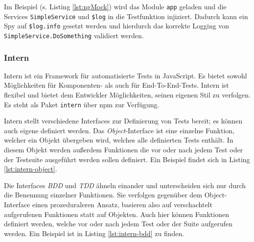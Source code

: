 \begin{figure}[H]
	
\end{figure}

Im Beispiel (s. Listing \ref{lst:ngMock}) wird das Module \texttt{app} geladen und die Services \texttt{SimpleService} und \texttt{\$log} in die Testfunktion injiziert. Dadurch kann ein Spy auf \texttt{\$log.info} gesetzt werden und hierdurch das korrekte Logging von \texttt{SimpleService.DoSomething} validiert werden.


\subsubsection{Intern}
\label{sec:Intern}
Intern ist ein Framework für automatisierte Tests in JavaScript. Es bietet sowohl Möglichkeiten für Komponenten- als auch für End-To-End-Tests. Intern ist flexibel und bietet dem Entwickler Möglichkeiten, seinen eigenen Stil zu verfolgen. Es steht als Paket \texttt{intern} über npm zur Verfügung.\cite{intern-userguide}

Intern stellt verschiedene Interfaces zur Definierung von Tests bereit; es können auch eigene definiert werden. Das \textit{Object}-Interface ist eine einzelne Funktion, welcher ein Objekt übergeben wird, welches alle definierten Tests enthält. In diesem Objekt werden außerdem Funktionen die vor oder nach jedem Test oder der Testsuite ausgeführt werden sollen definiert. Ein Beispiel findet sich in Listing \ref{lst:intern-object}.\cite{intern-userguide}

\begin{figure}[H]
	
\end{figure}

Die Interfaces \textit{BDD} und \textit{TDD} ähneln einander und unterscheiden sich nur durch die Benennung einzelner Funktionen. Sie verfolgen gegenüber dem Object-Interface einen prozeduraleren Ansatz, basieren also auf verschachtelt aufgerufenen Funktionen statt auf Objekten. Auch hier können Funktionen definiert werden, welche vor oder nach jedem Test oder der Suite aufgerufen werden. Ein Beispiel ist in Listing \ref{lst:intern-bdd} zu finden.\cite{intern-userguide}

\begin{figure}[H]
	
\end{figure}

